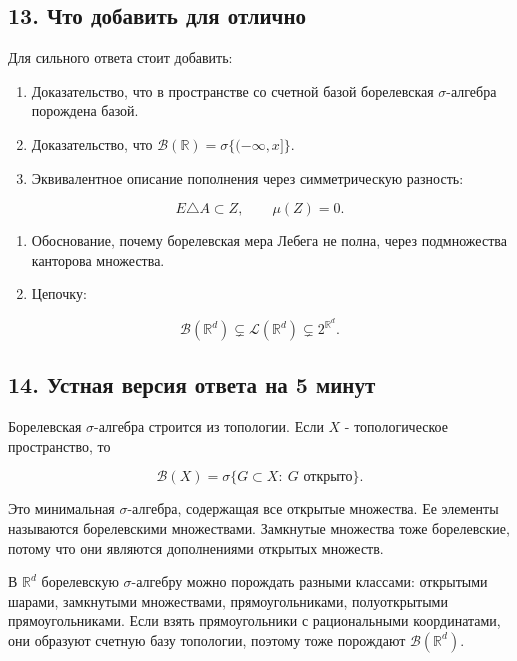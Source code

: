 \documentclass[
  11pt,
  a4paper,
]{article}
\providecommand{\tightlist}{%
  \setlength{\itemsep}{0pt}\setlength{\parskip}{0pt}}
\begin{document}
\subsection{13. Что добавить для
отлично}\label{ux447ux442ux43e-ux434ux43eux431ux430ux432ux438ux442ux44c-ux434ux43bux44f-ux43eux442ux43bux438ux447ux43dux43e}

Для сильного ответа стоит добавить:

\begin{enumerate}
\def\labelenumi{\arabic{enumi}.}
\tightlist
\item
  Доказательство, что в пространстве со счетной базой борелевская
  \(\sigma\)-алгебра порождена базой.
\item
  Доказательство, что \(\mathcal B(\mathbb R)=\sigma\{(-\infty,x]\}\).
\item
  Эквивалентное описание пополнения через симметрическую разность:
\end{enumerate}

\[
E\triangle A\subset Z,\qquad \mu(Z)=0.
\]

\begin{enumerate}
\def\labelenumi{\arabic{enumi}.}
\setcounter{enumi}{3}
\tightlist
\item
  Обоснование, почему борелевская мера Лебега не полна, через
  подмножества канторова множества.
\item
  Цепочку:
\end{enumerate}

\[
\mathcal B(\mathbb R^d)\subsetneq\mathcal L(\mathbb R^d)\subsetneq 2^{\mathbb R^d}.
\]

\subsection{14. Устная версия ответа на 5
минут}\label{ux443ux441ux442ux43dux430ux44f-ux432ux435ux440ux441ux438ux44f-ux43eux442ux432ux435ux442ux430-ux43dux430-5-ux43cux438ux43dux443ux442}

Борелевская \(\sigma\)-алгебра строится из топологии. Если \(X\) -
топологическое пространство, то

\[
\mathcal B(X)=\sigma\{G\subset X:\ G\text{ открыто}\}.
\]

Это минимальная \(\sigma\)-алгебра, содержащая все открытые множества.
Ее элементы называются борелевскими множествами. Замкнутые множества
тоже борелевские, потому что они являются дополнениями открытых
множеств.

В \(\mathbb R^d\) борелевскую \(\sigma\)-алгебру можно порождать разными
классами: открытыми шарами, замкнутыми множествами, прямоугольниками,
полуоткрытыми прямоугольниками. Если взять прямоугольники с
рациональными координатами, они образуют счетную базу топологии, поэтому
тоже порождают \(\mathcal B(\mathbb R^d)\).
\end{document}
